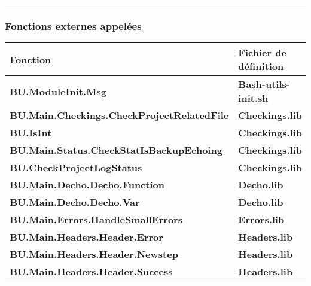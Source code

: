 \documentclass[a4paper,10pt]{article}
\begin{document}
\setlength{\parskip}{2em}



\color{sec3}\par\noindent\rule{\textwidth}{0.4pt}\color{text}\setlength{\parskip}{1em}

\color{sec3}
\subsubsection{Fonctions externes appelées}\color{text}

\begin{justify}
    \begin{tabular}{|l|l|}
        \hline
        \textbf{Fonction} & \textbf{Fichier de définition}\\
        \hline
        \textbf{\color{func}BU.ModuleInit.Msg}                           & \textbf{\color{path}Bash-utils-init.sh}\\
        \hline
        \textbf{\color{func}BU.Main.Checkings.CheckProjectRelatedFile}  & \textbf{\color{path}Checkings.lib}\\
        \hline
        \textbf{\color{func}BU.IsInt}                                     & \textbf{\color{path}Checkings.lib}\\
        \hline
        \textbf{\color{func}BU.Main.Status.CheckStatIsBackupEchoing}                & \textbf{\color{path}Checkings.lib}\\
        \hline
        \textbf{\color{func}BU.CheckProjectLogStatus}                     & \textbf{\color{path}Checkings.lib}\\
        \hline
        \textbf{\color{func}BU.Main.Decho.Decho.Function}                    & \textbf{\color{path}Decho.lib}\\
        \hline
        \textbf{\color{func}BU.Main.Decho.Decho.Var}                         & \textbf{\color{path}Decho.lib}\\
        \hline
        \textbf{\color{func}BU.Main.Errors.HandleSmallErrors}           & \textbf{\color{path}Errors.lib}\\
        \hline
        \textbf{\color{func}BU.Main.Headers.Header.Error}                               & \textbf{\color{path}Headers.lib}\\
        \hline
        \textbf{\color{func}BU.Main.Headers.Header.Newstep}                             & \textbf{\color{path}Headers.lib}\\
        \hline
        \textbf{\color{func}BU.Main.Headers.Header.Success}                             & \textbf{\color{path}Headers.lib}\\

\end{tabular}
\end{justify}
\end{document}

